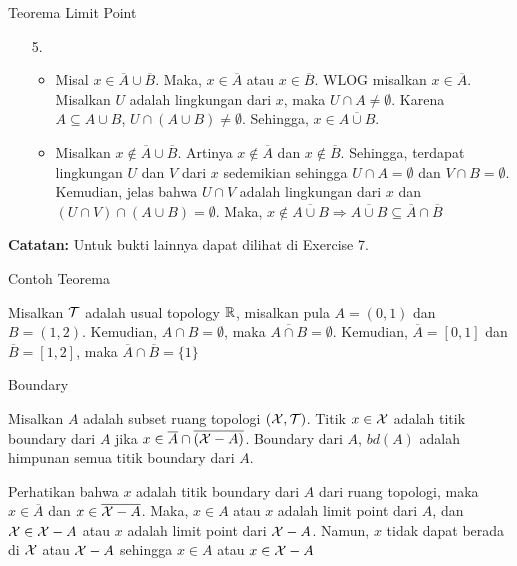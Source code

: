 \begin{frame}{Teorema Limit Point}
\begin{tcolorbox}[enhanced,title=Teorema 1.22 (Bukti), frame style tile={width=\paperwidth}{\wallpaper}]
\begin{enumerate}
\item[5.] \begin{itemize}
            \item Misal $x\in \overline{A}\cup \overline{B}$. Maka, $x \in \overline{A}$ atau $x\in \overline{B}$. WLOG misalkan $x\in \overline{A}$. Misalkan $U$ adalah lingkungan dari $x$, maka $U\cap A \neq \emptyset$. Karena $A\subseteq A\cup B$, $U\cap(A\cup B) \neq \emptyset$. Sehingga, $x\in \overline{A\cup B}$.
            \item Misalkan $x\notin \overline{A}\cup\overline{B}$. Artinya $x \notin \overline{A}$ dan $x\notin\overline{B}$. Sehingga, terdapat lingkungan $U$ dan $V$ dari $x$ sedemikian sehingga $U\cap A = \emptyset$ dan $V\cap B = \emptyset$. Kemudian, jelas bahwa $U\cap V$ adalah lingkungan dari $x$ dan $(U\cap V)\cap(A\cup B) = \emptyset$. Maka, $x\notin \overline{A\cup B}\Rightarrow \overline{A\cup B}\subseteq \overline{A}\cap\overline{B}$
        \end{itemize}
\end{enumerate}
\end{tcolorbox}
\textbf{Catatan:} Untuk bukti lainnya dapat dilihat di Exercise 7.
    
\end{frame}

\begin{frame}{Contoh Teorema}
\begin{tcolorbox}[enhanced,title=Contoh 43, frame style tile={width=\paperwidth}{\wallpaper}]
Misalkan $\mathcal{T}$ adalah usual topology $\mathbb{R}$, misalkan pula $A = (0,1)$ dan $B = (1,2)$. Kemudian, $A\cap B = \emptyset$, maka $\overline{A\cap B} = \emptyset$. Kemudian, $\overline{A} = [0,1]$ dan $\overline{B} = [1,2]$, maka $\overline{A}\cap\overline{B} = \{1\}$
\end{tcolorbox}
    
\end{frame}

\begin{frame}{Boundary}
    \begin{tcolorbox}[enhanced,title=Definisi, frame style tile={width=\paperwidth}{\wallpaper}]
    Misalkan $A$ adalah subset ruang topologi $(\mathcal{X}, \mathcal{T})$. Titik $x\in \mathcal{X}$ adalah titik boundary dari $A$ jika $x \in \overline{A}\cap \overline{(\mathcal{X}-A)}$. Boundary dari $A$, $bd(A)$ adalah himpunan semua titik boundary dari $A$.
    \end{tcolorbox}
    Perhatikan bahwa $x$ adalah titik boundary dari $A$ dari ruang topologi, maka $x\in\overline{A}$ dan $x\in \overline{\mathcal{X}-A}$. Maka, $x\in A$ atau $x$ adalah limit point dari $A$, dan $\mathcal{X}\in \mathcal{X} - A$ atau $x$ adalah limit point dari $\mathcal{X}-A$. Namun, $x$ tidak dapat berada di $\mathcal{X}$ atau $\mathcal{X}-A$ sehingga $x \in A$ atau $x \in \mathcal{X}-A$
\end{frame}

